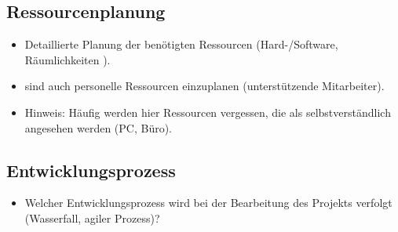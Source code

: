 \subsection{Ressourcenplanung}
\label{sec:Ressourcenplanung}

\begin{itemize}
	\item Detaillierte Planung der benötigten Ressourcen (Hard-/Software, Räumlichkeiten \usw).
	\item \Ggfs sind auch personelle Ressourcen einzuplanen (\zB unterstützende Mitarbeiter).
	\item Hinweis: Häufig werden hier Ressourcen vergessen, die als selbstverständlich angesehen werden (\zB PC, Büro). 
\end{itemize}


\subsection{Entwicklungsprozess}
\label{sec:Entwicklungsprozess}
\begin{itemize}
	\item Welcher Entwicklungsprozess wird bei der Bearbeitung des Projekts verfolgt (\zB Wasserfall, agiler Prozess)?
\end{itemize}
